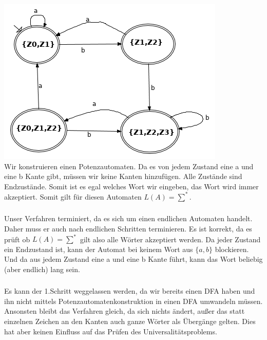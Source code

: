 \documentclass[a4paper,12pt]{scrartcl}
\begin{document}
\subsubsection{}
\includegraphics[scale=0.5]{152.png}\\
Wir konstruieren einen Potenzautomaten. Da es von jedem Zustand eine a und eine b Kante gibt, müssen wir keine Kanten hinzufügen. Alle Zustände sind Endzustände. Somit ist es egal welches Wort wir eingeben, das Wort wird immer akzeptiert. Somit gilt für diesen Automaten $L(A)=\sum^{*}$.
\subsubsection{}
Unser Verfahren terminiert, da es sich um einen endlichen Automaten handelt. Daher muss er auch nach endlichen Schritten terminieren. Es ist korrekt, da es prüft ob $L(A)=\sum^{*}$ gilt also alle Wörter akzeptiert werden. Da jeder Zustand ein Endzustand ist, kann der Automat bei keinem Wort aus $\{a,b\}$ blockieren. Und da aus jedem Zustand eine a und eine b Kante führt, kann das Wort beliebig (aber endlich) lang sein.
\subsubsection{}
Es kann der 1.Schritt weggelassen werden, da wir bereits einen DFA haben und ihn nicht mittels Potenzautomatenkonstruktion in einen DFA umwandeln müssen. Ansonsten bleibt das Verfahren gleich, da sich nichts ändert, außer das statt einzelnen Zeichen an den Kanten auch ganze Wörter als Übergänge gelten. Dies hat aber keinen Einfluss auf das Prüfen des Universalitätsproblems.
\end{document}
